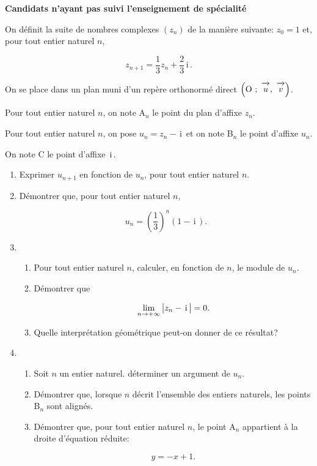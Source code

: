 \documentclass[10pt,a4paper]{article}
\newcommand{\vect}[1]{\overrightarrow{\,\mathstrut#1\,}}
\def\Ouv{$\left(\text{O}~;~\vect{u},~\vect{v}\right)$}
\renewcommand{\i}{\mathrm{\,i\,}}%
\begin{document}
\textbf{Candidats n'ayant pas suivi l'enseignement de spécialité}

\bigskip

On définit la suite de nombres complexes $(z_n)$ de la manière suivante: $z_0=1$ et, pour tout entier naturel $n$,

\[z_{n+1} = \dfrac{1}{3} z_{n} + \dfrac{2}{3}\i.\]

On se place dans un plan muni d'un repère orthonormé direct \Ouv.

Pour tout entier naturel $n$, on note A$_{n}$ le point du plan d'affixe $z_n$.

Pour tout entier naturel $n$, on pose $u_n=z_n-\i$ et on note B$_n$ le point d'affixe $u_n$.

On note C le point d'affixe $\i$.

\begin{enumerate}
\item Exprimer $u_{n+1}$ en fonction de $u_n$, pour tout entier naturel $n$.
\item Démontrer que,  pour tout entier naturel $n$,

\[u_n=\left (\dfrac{1}{3}\right )^{n} \left (1-\i\right ).\]

\item 
\begin{enumerate}
\item Pour tout entier naturel $n$, calculer, en fonction de $n$, le module de $u_n$.
\item Démontrer que

\[\lim_{n\to +\infty} \left |z_n-\i \strut\right |=0.\]
\item Quelle interprétation géométrique peut-on donner de ce résultat?
\end{enumerate}

\item 
\begin{enumerate}
\item Soit $n$ un entier naturel. déterminer un argument de $u_n$.
\item Démontrer que, lorsque $n$ décrit l'ensemble des entiers naturels, les points B$_n$ sont alignés.
\item Démontrer que, pour tout entier naturel $n$, le point A$_n$ appartient à la droite d'équation réduite:

\[y=-x+1.\]

\end{enumerate}
\end{enumerate}

\vspace{0,25cm}
\end{document}
